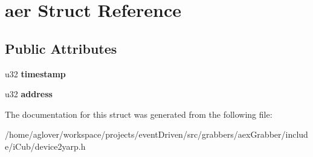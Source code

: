 \hypertarget{structaer}{\section{aer Struct Reference}
\label{structaer}
}
\subsection*{Public Attributes}
\begin{DoxyCompactItemize}
\item 
\hypertarget{structaer_a74e35f1258f6c79df0b88f2544c36b7d}{u32 {\bfseries timestamp}}\label{structaer_a74e35f1258f6c79df0b88f2544c36b7d}

\item 
\hypertarget{structaer_a427837e13cd5ba64e6e70552b6e3e78f}{u32 {\bfseries address}}\label{structaer_a427837e13cd5ba64e6e70552b6e3e78f}

\end{DoxyCompactItemize}


The documentation for this struct was generated from the following file\-:\begin{DoxyCompactItemize}
\item 
/home/aglover/workspace/projects/event\-Driven/src/grabbers/aex\-Grabber/include/i\-Cub/device2yarp.\-h\end{DoxyCompactItemize}
